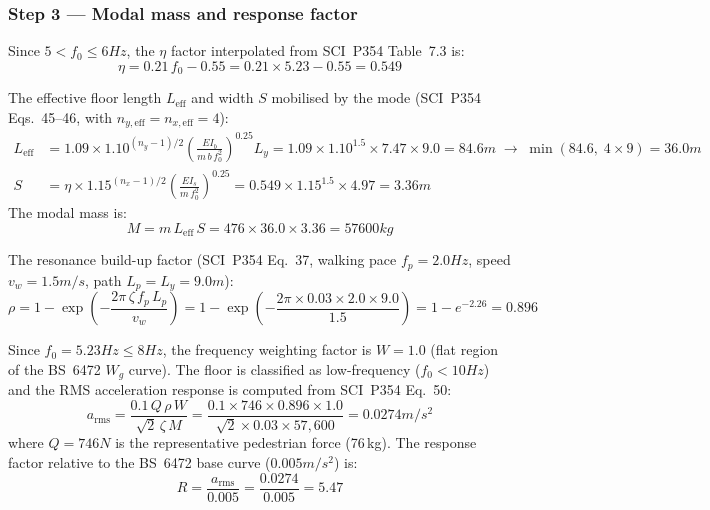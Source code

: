\subsubsection*{Step 3 --- Modal mass and response factor}

Since $5 < f_0 \leq 6Hz$, the $\eta$ factor interpolated from SCI~P354 Table~7.3 is:
\begin{equation}
    \eta = 0.21\,f_0 - 0.55 = 0.21 \times 5.23 - 0.55 = 0.549
\end{equation}

The effective floor length $L_\mathrm{eff}$ and width $S$ mobilised by the mode (SCI~P354 Eqs.~45--46, with $n_{y,\mathrm{eff}} = n_{x,\mathrm{eff}} = 4$):
\begin{align}
    L_\mathrm{eff} &= 1.09 \times 1.10^{(n_y-1)/2}
        \left(\frac{EI_b}{m\,b\,f_0^2}\right)^{0.25} L_y
    = 1.09 \times 1.10^{1.5} \times 7.47 \times 9.0 = 84.6m
    \;\to\; \min(84.6,\;4 \times 9) = 36.0m \\
    S &= \eta \times 1.15^{(n_x-1)/2}
        \left(\frac{EI_s}{m\,f_0^2}\right)^{0.25}
    = 0.549 \times 1.15^{1.5} \times 4.97 = 3.36m
\end{align}
The modal mass is:
\begin{equation}
    M = m\,L_\mathrm{eff}\,S = 476 \times 36.0 \times 3.36 = 57600kg
\end{equation}

The resonance build-up factor (SCI~P354 Eq.~37, walking pace $f_p = 2.0Hz$, speed $v_w = 1.5m/s$, path $L_p = L_y = 9.0m$):
\begin{equation}
    \rho = 1 - \exp\!\left(-\frac{2\pi\,\zeta\,f_p\,L_p}{v_w}\right)
         = 1 - \exp\!\left(-\frac{2\pi \times 0.03 \times 2.0 \times 9.0}{1.5}\right)
         = 1 - e^{-2.26} = 0.896
\end{equation}

Since $f_0 = 5.23Hz \leq 8Hz$, the frequency weighting factor is $W = 1.0$ (flat region of the BS~6472 $W_g$ curve). The floor is classified as low-frequency ($f_0 < 10Hz$) and the RMS acceleration response is computed from SCI~P354 Eq.~50:
\begin{equation}
    a_\mathrm{rms} = \frac{0.1\,Q\,\rho\,W}{\sqrt{2}\,\zeta\,M}
    = \frac{0.1 \times 746 \times 0.896 \times 1.0}{\sqrt{2} \times 0.03 \times 57{,}600}
    = 0.0274m/s^2
\end{equation}
where $Q = 746N$ is the representative pedestrian force (76\,kg). The response factor relative to the BS~6472 base curve ($0.005m/s^2$) is:
\begin{equation}
    R = \frac{a_\mathrm{rms}}{0.005} = \frac{0.0274}{0.005} = 5.47
\end{equation}

